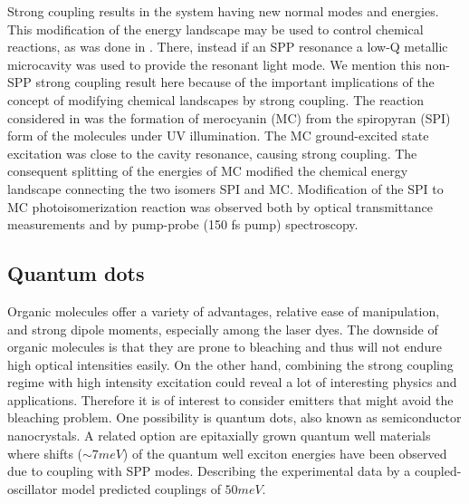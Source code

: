 \documentclass[12pt]{iopart}
\begin{document}
Strong coupling results in the system having new normal modes and energies. This modification of the energy landscape may be used to control chemical reactions, as was done in \cite{Hutchison2012}. There, instead if an SPP resonance a low-Q metallic microcavity was used to provide the resonant light mode. We mention this non-SPP strong coupling result here because of the important implications of the concept of modifying chemical landscapes by strong coupling. The reaction considered in \cite{Hutchison2012} was the formation of merocyanin (MC) from the spiropyran (SPI) form of the molecules under UV illumination. The MC ground-excited state excitation was close to the cavity resonance, causing strong coupling. The consequent splitting of the energies of MC modified the chemical energy landscape connecting the two isomers SPI and MC. Modification of the SPI to MC photoisomerization reaction was observed both by optical transmittance measurements and by pump-probe (150 fs pump) spectroscopy.

\subsection{Quantum dots} 

Organic molecules offer a variety of advantages, relative ease of manipulation, and strong dipole moments, especially among the laser dyes. The downside of organic molecules is that they are prone to bleaching and thus will not endure high optical intensities easily. On the other hand, combining the strong coupling regime with high intensity excitation could reveal a lot of interesting physics and applications. Therefore it is of interest to consider emitters that might avoid the bleaching problem. One possibility is quantum dots, also known as semiconductor nanocrystals. A related option are epitaxially grown quantum well materials where shifts ($\sim 7 meV$) of the quantum well exciton energies have been observed \cite{Vasa2008} due to coupling with SPP modes. Describing the experimental data by a coupled-oscillator model predicted couplings of $50 meV$. 
\end{document}
